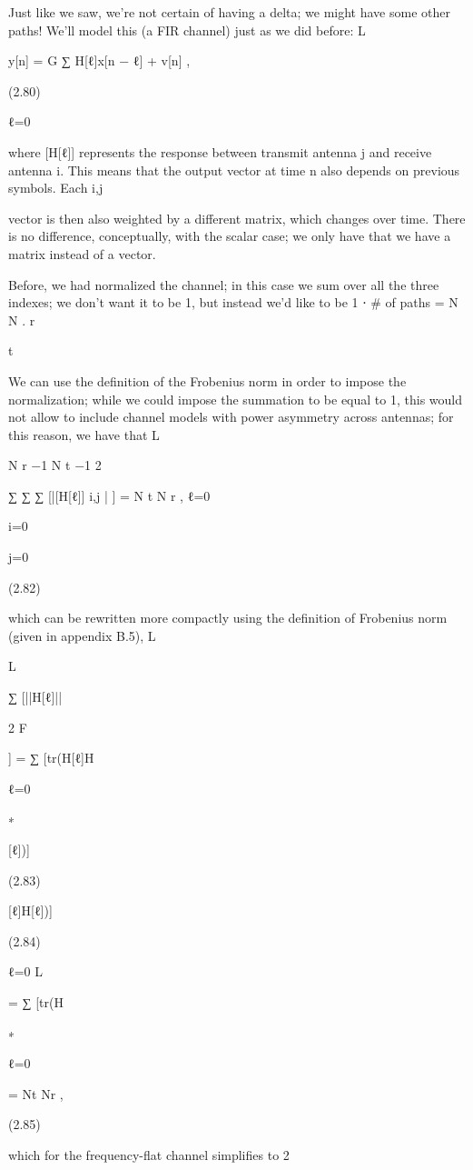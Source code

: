 {Just like we saw, we're not certain of having a delta; we might have some other paths!
We'll model this (a FIR channel) just as we did before:
L

y[n] = \sqrt G ∑ H[ℓ]x[n − ℓ] + v[n] ,

(2.80)

ℓ=0

where [H[ℓ]] represents the response between transmit antenna j and receive antenna i.
This means that the output vector at time n also depends on previous symbols. Each i,j

vector is then also weighted by a different matrix, which changes over time.
There is no difference, conceptually, with the scalar case; we only have that we have a matrix instead of a vector.

Before, we had normalized the channel; in this case we sum over all the three indexes;
we don't want it to be 1, but instead we'd like to be 1 ⋅ # of paths = N N .
r

t

We can use the definition of the Frobenius norm in order to impose the normalization;
while we could impose the summation to be equal to 1, this would not allow to include channel models with power asymmetry across antennas; for this reason, we have that L

N r −1 N t −1 2

∑ ∑ ∑ [|[H[ℓ]] i,j | ] = N t N r ,
ℓ=0

i=0

j=0

(2.82)

which can be rewritten more compactly using the definition of Frobenius norm (given in appendix B.5),
L

L

∑ [||H[ℓ]||

2 F

] = ∑ [tr(H[ℓ]H

ℓ=0

∗

[ℓ])]

(2.83)

[ℓ]H[ℓ])]

(2.84)

ℓ=0 L

= ∑ [tr(H

∗

ℓ=0

= Nt Nr ,

(2.85)

which for the frequency-flat channel simplifies to 2

}
